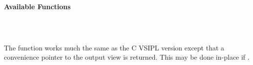 \\\cvsiplh
\newline \hspace*{.8cm} \vspace*{.1cm} \textbf{Available Functions }
\newline \hspace*{1.1cm} {
\ttfamily
\begin{tabular}[H]{l}
\end{tabular}
}
\\\pyjvsiph
{}
\newline\hspace*{1.2cm}\parbox{10.8cm}{\vspace*{.1cm}The  function works much the same as the C VSIPL version except that a convenience pointer to the output view is returned. This may be done in-place if .}
